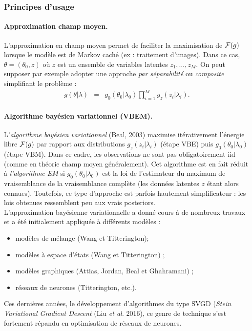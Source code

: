 \subsubsection{Principes d'usage}

\paragraph{\bf Approximation champ moyen.} L'approximation en champ moyen permet de faciliter la maximisation de ${\cal{F}}(g)$ lorsque le modèle est de Markov caché  (ex : traitement d'images). Dans ce cas, $\theta=(\theta_0,z)$ où $z$ est un ensemble de variables latentes $z_1,\ldots,z_M$. On peut supposer par exemple adopter une approche \emph{\it par séparabilité} ou \emph{\it composite} simplifiant le problème :
\begin{eqnarray*}
g(\theta|\lambda) & = & g_{0}(\theta_0|\lambda_0) \prod\limits_{i=1}^M g_z(z_i|\lambda_i).
\end{eqnarray*}

\paragraph{\bf Algorithme bayésien variationnel (VBEM).} L'\emph{algorithme bayésien variationnel} (Beal, 2003) maximise itérativement l'énergie libre ${\cal{F}}(g)$ par rapport aux distributions $g_z(z_i|\lambda_i)$ (étape VBE) puis $g_{0}(\theta_0|\lambda_0)$ (étape VBM). Dans ce cadre, les observations ne sont pas obligatoirement iid (comme en théorie champ moyen généralement). Cet algorithme est en fait réduit à \emph{l'algorithme EM}  si $g_{0}(\theta_0|\lambda_0)$ est la loi de l'estimateur du maximum de vraisemblance de la vraisemblance complète (les données latentes $z$ étant alors connues). Toutefois, ce type d'approche est parfois hautement simplificateur : les lois obtenues ressemblent peu aux vrais posteriors. \\

L'approximation bayésienne variationnelle a donné cours à de nombreux travaux et a été initialement appliquée à différents modèles : 
\begin{itemize}
\item modèles de mélange (Wang et Titterington); 
\item modèles à espace d'états (Wang et Titterington) ; 
\item modèles graphiques (Attias, Jordan, Beal et Ghahramani) ; 
\item réseaux de neurones (Titterington, etc.).
\end{itemize}
Ces dernières années, le développement d'algorithmes du type SVGD (\textit{Stein Variational Gradient Descent} (Liu {\it et al.} 2016), ce genre de technique s'est fortement répandu en optimisation de réseaux de neurones.  

